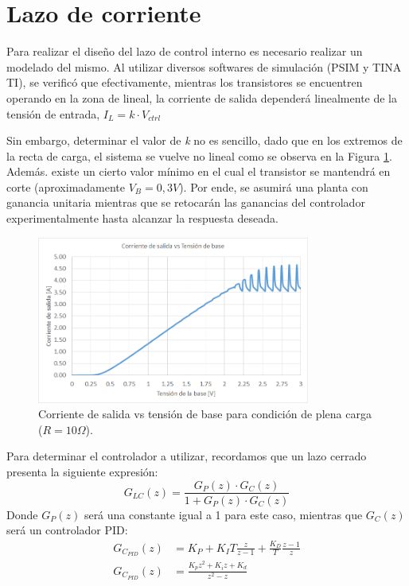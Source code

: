 \section{Lazo de corriente}
Para realizar el diseño del lazo de control interno es necesario realizar un modelado del mismo. Al utilizar diversos softwares de simulación (PSIM y TINA TI), se verificó que efectivamente, mientras los transistores se encuentren operando en la zona de  lineal, la corriente de salida dependerá linealmente de la tensión de entrada, $I_L=k\cdot V_{ctrl}$\par 
Sin embargo, determinar el valor de \textit{k} no es sencillo, dado que en los extremos de la recta de carga, el sistema se vuelve no lineal como se observa en la Figura \ref{F:Recta_de_carga_corriente}. Además. existe un cierto valor mínimo en el cual el transistor se mantendrá en corte (aproximadamente $V_B=0,3V$). Por ende, se asumirá una planta con ganancia unitaria mientras que se retocarán las ganancias del controlador experimentalmente hasta alcanzar la respuesta deseada.\par 
\begin{figure} [H]
	\centering
	\includegraphics[width=0.8\textwidth]{./imagenes/Recta_de_carga_corriente.png}
	\caption{Corriente de salida vs tensión de base para condición de plena carga ($R=10\Omega$).}
	\label{F:Recta_de_carga_corriente}
\end{figure} \par 

Para determinar el controlador a utilizar, recordamos que un lazo cerrado presenta la siguiente expresión:
\begin{equation}
G_{LC}(z)=\frac{G_P(z)\cdot G_C(z)}{1+G_P(z)\cdot G_C(z)}
\end{equation}
Donde $G_P(z)$ será una constante igual a 1 para este caso, mientras que  $G_C(z)$ será un controlador PID:
\begin{equation} 
\begin{split}
G_{C_{PID}}(z)&=K_P+K_IT\frac{z}{z-1}+\frac{K_D}{T}\frac{z-1}{z} \\
G_{C_{PID}}(z)&=\frac{K_pz^2+K_iz+K_d}{z^2-z}
\end{split}
\end{equation}\par 


